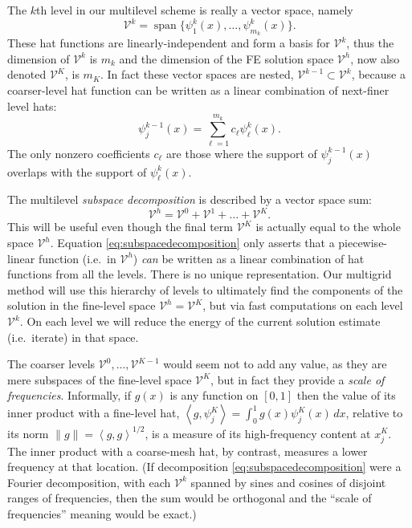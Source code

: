 \documentclass[letterpaper,final,12pt,reqno]{amsart}
\newcommand{\ip}[2]{\left<#1,#2\right>}
\begin{document}
The $k$th level in our multilevel scheme is really a vector space, namely
\begin{equation}
  \mathcal{V}^k = \operatorname{span}\{\psi_1^k(x),\dots,\psi_{m_k}^k(x)\}.  \label{eq:definevk}
\end{equation}
These hat functions are linearly-independent and form a basis for $\mathcal{V}^k$, thus the dimension of $\mathcal{V}^k$ is $m_k$ and the dimension of the FE solution space $\mathcal{V}^h$, now also denoted $\mathcal{V}^K$, is $m_K$.  In fact these vector spaces are nested, $\mathcal{V}^{k-1} \subset \mathcal{V}^k$, because a coarser-level hat function can be written as a linear combination of next-finer level hats:
\begin{equation}
   \psi_j^{k-1}(x) = \sum_{\ell=1}^{m_k} c_\ell \psi_\ell^k(x). \label{eq:hatcombination}
\end{equation}
The only nonzero coefficients $c_\ell$ are those where the support of $\psi_j^{k-1}(x)$ overlaps with the support of $\psi_\ell^k(x)$.

The multilevel \emph{subspace decomposition} is described by a vector space sum:
\begin{equation}
  \mathcal{V}^h = \mathcal{V}^0 + \mathcal{V}^1 + \dots + \mathcal{V}^K. \label{eq:subspacedecomposition}
\end{equation}
This will be useful even though the final term $\mathcal{V}^K$ is actually equal to the whole space $\mathcal{V}^h$.  Equation \eqref{eq:subspacedecomposition} only asserts that a piecewise-linear function (i.e.~in $\mathcal{V}^h$) \emph{can} be written as a linear combination of hat functions from all the levels.  There is no unique representation.  Our multigrid method will use this hierarchy of levels to ultimately find the components of the solution in the fine-level space $\mathcal{V}^h=\mathcal{V}^K$, but via fast computations on each level $\mathcal{V}^k$.  On each level we will reduce the energy of the current solution estimate (i.e.~iterate) in that space.

The coarser levels $\mathcal{V}^0,\dots,\mathcal{V}^{K-1}$ would seem not to add any value, as they are mere subspaces of the fine-level space $\mathcal{V}^K$, but in fact they provide a \emph{scale of frequencies}.  Informally, if $g(x)$ is any function on $[0,1]$ then the value of its inner product with a fine-level hat, $\ip{g}{\psi_j^K} = \int_0^1 g(x) \psi_j^K(x)\,dx$, relative to its norm $\|g\| = \ip{g}{g}^{1/2}$, is a measure of its high-frequency content at $x_j^K$.  The inner product with a coarse-mesh hat, by contrast, measures a lower frequency at that location.  (If decomposition \eqref{eq:subspacedecomposition} were a Fourier decomposition, with each $\mathcal{V}^k$ spanned by sines and cosines of disjoint ranges of frequencies, then the sum would be orthogonal and the ``scale of frequencies'' meaning would be exact.)
\end{document}
